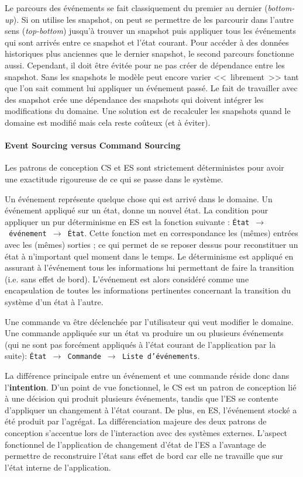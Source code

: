 Le parcours des événements se fait classiquement du premier au dernier 
(\textit{bottom-up}). Si on utilise les \gls{snapshot}, on peut se permettre de les 
parcourir dans l'autre sens (\textit{top-bottom}) jusqu'à trouver un \gls{snapshot} 
puis appliquer tous les événements qui sont arrivés entre ce \gls{snapshot} et 
l'état courant. Pour accéder à des données historiques 
plus anciennes que le dernier \gls{snapshot}, le second parcours fonctionne 
aussi. Cependant, il doit être évitée pour ne pas créer de dépendance entre 
les \gls{snapshot}. Sans les snapshots le modèle peut encore varier 
<<~librement~>> tant que l'on sait comment lui appliquer un événement passé. 
Le fait de travailler avec des \gls{snapshot} crée une dépendance des 
snapshots qui doivent intégrer les modifications du domaine. Une solution est 
de recalculer les snapshots quand le domaine est modifié mais cela reste 
coûteux (et à éviter).

\paragraph{Event Sourcing versus Command Sourcing}
Les patrons de conception \gls{CS} et \gls{ES} sont strictement déterministes pour 
avoir une exactitude rigoureuse de ce qui se passe dans le système.

Un événement représente quelque chose qui est arrivé dans le domaine. Un 
événement appliqué sur un état, donne un nouvel état. 
La condition pour appliquer un pur déterminisme en \gls{ES} est la fonction 
suivante : \texttt{État~$\rightarrow$~événement~$\rightarrow$~État}. 
Cette fonction met en correspondance les (mêmes) entrées avec les (mêmes) 
sorties ; ce qui permet de se reposer dessus pour reconstituer un état à 
n'important quel moment dans le temps. 
Le déterminisme est appliqué en assurant à l'événement tous les 
informations lui permettant de faire la transition (i.e. sans effet de bord). 
L'événement est alors considéré comme une encapsulation de toutes les 
informations pertinentes concernant la transition du système d'un état à l'autre.

Une commande va être déclenchée par l'utilisateur qui veut modifier le domaine. 
Une commande appliquée sur un état va produire un ou plusieurs événements (qui 
ne sont pas forcément appliqués à l'état courant de l'application par la suite): 
\texttt{État~$\rightarrow$~Commande $\rightarrow$~Liste d'événements}.

La différence principale entre un événement et une commande réside donc dans 
l'\textbf{inten\-tion}. D'un point de vue fonctionnel, le \gls{CS} est un patron de 
conception lié à une décision qui produit plusieurs événements, tandis que 
l'\gls{ES} se contente d'appliquer un changement à l'état courant. De plus, en 
\gls{ES}, l'événement stocké a été produit par l'agrégat. 
La différenciation majeure des deux patrons de conception s'accentue lors de 
l'interaction avec des systèmes externes. L'aspect fonctionnel de l'application de 
changement d'état de l'\gls{ES} a l'avantage de permettre de reconstruire l'état sans 
effet de bord car elle ne travaille que sur l'état interne de l'application. 

